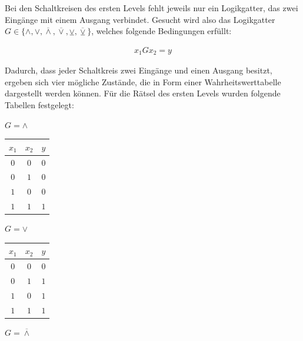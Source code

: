 Bei den Schaltkreisen des ersten Levels fehlt jeweils nur ein Logikgatter, das zwei Eingänge mit einem Ausgang verbindet.
Gesucht wird also das Logikgatter $G \in \{\land , \lor , \overline{\land}, \overline{\lor}, \veebar, \overline{\veebar}\}$, welches folgende Bedingungen erfüllt:

\begin{align*}
    x_1 G x_2 = y
\end{align*}

Dadurch, dass jeder Schaltkreis zwei Eingänge und einen Ausgang besitzt, ergeben sich vier mögliche Zustände, die in Form einer Wahrheitswerttabelle dargestellt werden können.
Für die Rätsel des ersten Levels wurden folgende Tabellen festgelegt:

\begin{table}[h!]
    \centering
    \begin{minipage}{.33\textwidth}
        $G = \land$\\
        \vfill
        \begin{tabular}{|c|c|c|} 
            \hline
            $x_1$ & $x_2$ & $y$ \\
            \hline\hline
            $0$ & $0$ & $0$ \\
            $0$ & $1$ & $0$ \\
            $1$ & $0$ & $0$ \\
            $1$ & $1$ & $1$ \\
            \hline
        \end{tabular}
    \end{minipage}
    \hfill
    \begin{minipage}{.32\textwidth}
        $G = \lor$\\
        \vfill
        \begin{tabular}{|c|c|c|} 
            \hline
            $x_1$ & $x_2$ & $y$ \\
            \hline\hline
            $0$ & $0$ & $0$ \\
            $0$ & $1$ & $1$ \\
            $1$ & $0$ & $1$ \\
            $1$ & $1$ & $1$ \\
            \hline
        \end{tabular}
    \end{minipage}
    \hfill
    \begin{minipage}{.33\textwidth}
        $G = \overline{\land}$\\
        \vfill
        \begin{tabular}{|c|c|c|} 

\end{tabular}
\end{minipage}
\end{table}
